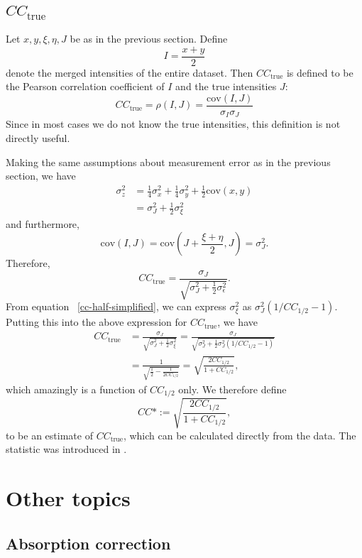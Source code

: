 \documentclass{report}
\newcommand{\CChalf}{CC_{1/2}}
\newcommand{\CCtrue}{CC_{\mathrm{true}}}
\newcommand{\CCstar}{CC\ast}
\newcommand{\cov}{\mathrm{cov}}
\begin{document}
\section{$\CCtrue$}
Let $x, y, \xi, \eta, J$ be as in the previous section. Define
\[ I = \frac{x+y}{2} \]
denote the merged intensities of the entire dataset.
Then $\CCtrue$ is defined to be the Pearson correlation coefficient of $I$ and the true intensities $J$:
\begin{equation}
  \label{cc-true-definition}
  \CCtrue = \rho(I, J) = \frac{\cov(I, J)}{\sigma_I \sigma_J}
\end{equation}
Since in most cases we do not know the true intensities, this definition is not directly useful.

Making the same assumptions about measurement error as in the previous section, we have
\begin{align*}
  \sigma^2_z &= \frac{1}{4} \sigma^2_x + \frac{1}{4}\sigma^2_y  + \frac{1}{2} \cov(x, y) \\
  &= \sigma_J^2 + \frac{1}{2} \sigma_\xi^2
\end{align*}
and furthermore,
\[ \cov(I, J) = \cov(J + \frac{\xi+\eta}{2}, J) = \sigma^2_J. \]
Therefore,
\[ \CCtrue = \frac{\sigma_J}{\sqrt{\sigma^2_J + \frac{1}{2}\sigma^2_\epsilon}}. \]
From equation ~\ref{cc-half-simplified}, we can express $\sigma^2_\xi$ as $\sigma^2_J(1/\CChalf-1)$. Putting this into the above
expression for $\CCtrue$, we have
\begin{align*}
  \CCtrue &= \frac{\sigma_J}{\sqrt{\sigma_J^2 + \frac{1}{2}\sigma^2_\xi}}
  = \frac{\sigma_J}{\sqrt{\sigma_J^2 + \frac{1}{2}\sigma^2_J(1/\CChalf-1)}} \\
  &= \frac{1}{\sqrt{\frac{1}{2}-\frac{1}{2 \CChalf}}}
  = \sqrt{\frac{2 \CChalf}{1+\CChalf}},
\end{align*}
which amazingly is a function of $\CChalf$ only. We therefore define
\begin{equation}
  \label{cc-star-definition}
  \CCstar := \sqrt{\frac{2 \CChalf}{1+\CChalf}},
\end{equation}
to be an estimate of $\CCtrue$, which can be calculated directly from the data. The statistic was introduced in \cite{karplus-diederichs-2012}.


\chapter{Other topics}

\section{Absorption correction}
\end{document}
